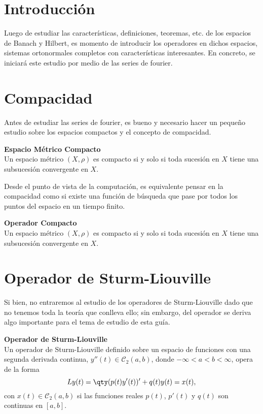 \section*{Introducción}
Luego de estudiar las características, definiciones, teoremas, etc. de los espacios de Banach y Hilbert, es momento de introducir los operadores en dichos espacios, sistemas ortonormales completos con características interesantes. En concreto, se iniciará este estudio por medio de las series de fourier.


\section*{Compacidad}

Antes de estudiar las series de fourier, es bueno y necesario hacer un pequeño estudio sobre los espacios compactos y el concepto de compacidad.


\begin{mdframed}[style=warning]
	{\large \textbf{Espacio Métrico Compacto}} \\
	Un espacio métrico $(X,\rho)$ es compacto si y solo si toda sucesión en $X$ tiene una subsucesión convergente en $X$.
\end{mdframed}

Desde el punto de vista de la computación, es equivalente pensar en la compacidad como si existe una función de búsqueda que pase por todos los puntos del espacio en un tiempo finito. 


\begin{mdframed}[style=warning]
	{\large \textbf{Operador Compacto}} \\
	Un espacio métrico $(X,\rho)$ es compacto si y solo si toda sucesión en $X$ tiene una subsucesión convergente en $X$.
\end{mdframed}



\section*{Operador de Sturm-Liouville}
Si bien, no entraremos al estudio de los operadores de Sturm-Liouville dado que no tenemos toda la teoría que conlleva ello; sin embargo, del operador se deriva algo importante para el tema de estudio de esta guía.



\begin{mdframed}[style=warning]
	{\large \textbf{Operador de Sturm-Liouville}} \\
	Un operador de Sturm-Liouville definido sobre un espacio de funciones con una segunda derivada continua, $y''(t) \in \mathcal{C} _2 (a,b)$, donde $-\infty < a < b < \infty$, opera de la forma
		$$ L y(t) = \qty(p(t) y'(t))' + q(t) y(t) = x(t), $$
	con $x(t)\in \mathcal{C} _2 (a,b)$ si las funciones reales $p(t)$, $p'(t)$ y $q(t)$ son continuas en $[a,b]$.
\end{mdframed}

